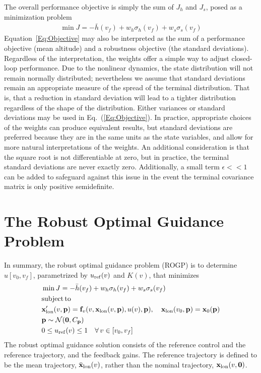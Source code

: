The overall performance objective is simply the sum of $J_h$ and $J_s$, posed as a minimization problem
\begin{align}
	\min J = -\bar{h}(v_f) + w_h\sigma_h(v_f) + w_s\sigma_s(v_f) \label{Eq:Objective}
\end{align}
Equation~\eqref{Eq:Objective} may also be interpreted as the sum of a performance objective (mean altitude) and a robustness objective (the standard deviations). Regardless of the interpretation, the weights offer a simple way to adjust closed-loop performance. Due to the nonlinear dynamics, the state distribution will not remain normally distributed; nevertheless we assume that standard deviations remain an appropriate measure of the spread of the terminal distribution. That is, that a reduction in standard deviation will lead to a tighter distribution regardless of the shape of the distribution. Either variances or standard deviations may be used in Eq.~(\ref{Eq:Objective}). In practice, appropriate choices of the weights can produce equivalent results, but standard deviations are preferred because they are in the same units as the state variables, and allow for more natural interpretations of the weights. An additional consideration is that the square root is not differentiable at zero, but in practice, the terminal standard deviations are never exactly zero. Additionally, a small term $\epsilon<<1$ can be added to safeguard against this issue in the event the terminal covariance matrix is only positive semidefinite.

\section{The Robust Optimal Guidance Problem}\label{Sec:ROGP}
In summary, the robust optimal guidance problem (ROGP) is to determine $u[v_0,v_f]$, parametrized by $u_{\mathrm{ref}}(v)$ and $K(v)$, that minimizes
\begin{align}
	&\min J = -\bar{h}(v_f) + w_h\sigma_h(v_f) + w_s\sigma_s(v_f) \nonumber\\
	&\mathrm{subject\, to }\nonumber \\
	&\mathbf{x}_{\mathrm{lon}}'(v,\mathbf{p}) = \mathbf{f}_v(v, \mathbf{x}_{\mathrm{lon}}(v,\mathbf{p}), u(v), \mathbf{p}),\quad
	\mathbf{x}_{\mathrm{lon}}(v_0,\mathbf{p}) = \mathbf{x}_0(\mathbf{p}) \label{Eq:ROGP}\\
	&\mathbf{p}\sim \mathcal{N}(\mathbf{0},C_{\mathbf{p}}) \nonumber\\
	&0 \le u_{\mathrm{ref}}(v) \le 1 \quad \forall\,v\in [v_0, v_f] \nonumber
\end{align}
The robust optimal guidance solution consists of the reference control and the reference trajectory, and the feedback gains. The reference trajectory is defined to be the mean trajectory, $\bar{\mathbf{x}}_{\mathrm{lon}}(v)$, rather than the nominal trajectory, $\mathbf{x}_{\mathrm{lon}}(v,\mathbf{0})$. 

